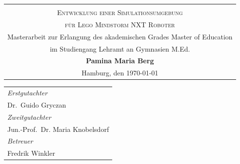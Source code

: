 \begin{titlepage}
\begin{center} 
\vspace{0.5cm} 
\begin{tabular}{c}
 \vspace{1.5cm}\\
\Large \textsc{Entwicklung einer Simulationsumgebung}\\
\vspace{0.5cm}
\Large \textsc{für Lego Mindstorm NXT Roboter}\\
\small Masterarbeit zur Erlangung des akademischen Grades Master of Education\\
\vspace{1.25cm}
\small im Studiengang Lehramt an Gymnasien M.Ed.\\
\vspace{1.25cm}
\large \textbf{Pamina Maria Berg}\\
\normalsize Hamburg, den \today
\end{tabular}
\par 
\end{center}
\par
\vspace*{3cm}
\begin{tabular}{l}
\emph{Erstgutachter}\\
Dr.\, Guido Gryczan\\
\emph{Zweitgutachter}\\
Jun.-Prof.\, Dr. Maria Knobelsdorf\\
\emph{Betreuer}\\
Fredrik Winkler\\
\end{tabular}

\end{titlepage}
